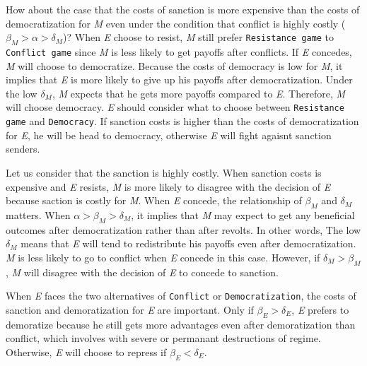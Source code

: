 \documentclass[11pt]{article}
\begin{document}
How about the case that the costs of sanction is more expensive than the costs of democratization for \textit{M} even under the condition that conflict is highly costly ($\beta_{M} > \alpha > \delta_{M}$)? When \textit{E} choose to resist, \textit{M} still prefer \texttt{Resistance game} to \texttt{Conflict game} since \textit{M} is less likely to get payoffs after conflicts. If \textit{E} concedes, \textit{M} will choose to democratize. Because the costs of democracy is low for \textit{M}, it implies that \textit{E} is more likely to give up his payoffs after democratization. Under the low $\delta_{M}$, \textit{M} expects that he gets more payoffs compared to \textit{E}. Therefore, \textit{M} will choose democracy. \textit{E} should consider what to choose between \texttt{Resistance game} and \texttt{Democracy}. If sanction costs is higher than the costs of democratization for \textit{E}, he will be head to democracy, otherwise \textit{E} will fight agaisnt sanction senders.


Let us consider that the sanction is highly costly. When sanction costs is expensive and \textit{E} resists, \textit{M} is more likely to disagree with the decision of \textit{E} because saction is costly for \textit{M}. When \textit{E} concede, the relationship of $\beta_{M}$ and $\delta_{M}$ matters. When $\alpha > \beta_{M} > \delta_{M}$, it implies that \textit{M} may expect to get any beneficial outcomes after democratization rather than after revolts. In other words, The low $\delta_{M}$ means that \textit{E} will tend to redistribute his payoffs even after democratization. \textit{M} is less likely to go to conflict when \textit{E} concede in this case. However, if $\delta_{M} > \beta_{M}$, \textit{M} will disagree with the decision of \textit{E} to concede to sanction.

When \textit{E} faces the two alternatives of \texttt{Conflict} or \texttt{Democratization}, the costs of sanction and demoratization for \textit{E} are important. Only if $\beta_{E} > \delta_{E}$, \textit{E} prefers to demoratize because he  still gets more advantages even after demoratization than conflict, which involves with severe or permanant destructions of regime. Otherwise, \textit{E} will choose to repress if $\beta_{E} < \delta_{E}$.
\end{document}
